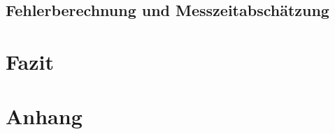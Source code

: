 \documentclass[twoside,colorback,accentcolor=tud4c,11pt]{tudreport}
\begin{document}
\section{Fehlerberechnung und Messzeitabschätzung}

\chapter{Fazit}


\chapter{Anhang}





		

\renewcommand{\bibname}{Literaturverzeichnis}
\begin{thebibliography}{Bak89}



\end{thebibliography} 	
\end{document}
